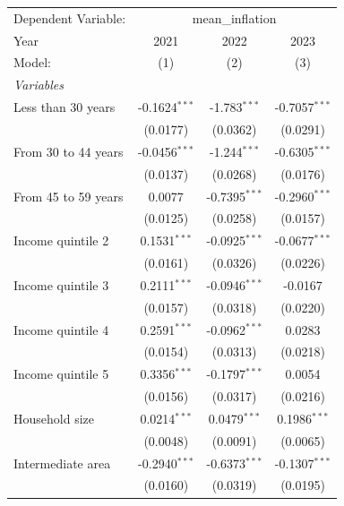 
\begingroup
\centering
\begin{tabular}{lccc}
   \tabularnewline \midrule \midrule
   Dependent Variable: & \multicolumn{3}{c}{mean\_inflation}\\
   Year                   & 2021            & 2022            & 2023 \\   
   Model:                 & (1)             & (2)             & (3)\\  
   \midrule
   \emph{Variables}\\
   Less than 30 years     & -0.1624$^{***}$ & -1.783$^{***}$  & -0.7057$^{***}$\\   
                          & (0.0177)        & (0.0362)        & (0.0291)\\   
   From 30 to 44 years    & -0.0456$^{***}$ & -1.244$^{***}$  & -0.6305$^{***}$\\   
                          & (0.0137)        & (0.0268)        & (0.0176)\\   
   From 45 to 59 years    & 0.0077          & -0.7395$^{***}$ & -0.2960$^{***}$\\   
                          & (0.0125)        & (0.0258)        & (0.0157)\\   
   Income quintile 2      & 0.1531$^{***}$  & -0.0925$^{***}$ & -0.0677$^{***}$\\   
                          & (0.0161)        & (0.0326)        & (0.0226)\\   
   Income quintile 3      & 0.2111$^{***}$  & -0.0946$^{***}$ & -0.0167\\   
                          & (0.0157)        & (0.0318)        & (0.0220)\\   
   Income quintile 4      & 0.2591$^{***}$  & -0.0962$^{***}$ & 0.0283\\   
                          & (0.0154)        & (0.0313)        & (0.0218)\\   
   Income quintile 5      & 0.3356$^{***}$  & -0.1797$^{***}$ & 0.0054\\   
                          & (0.0156)        & (0.0317)        & (0.0216)\\   
   Household size         & 0.0214$^{***}$  & 0.0479$^{***}$  & 0.1986$^{***}$\\   
                          & (0.0048)        & (0.0091)        & (0.0065)\\   
   Intermediate area      & -0.2940$^{***}$ & -0.6373$^{***}$ & -0.1307$^{***}$\\   
                          & (0.0160)        & (0.0319)        & (0.0195)\\   

\end{tabular}
